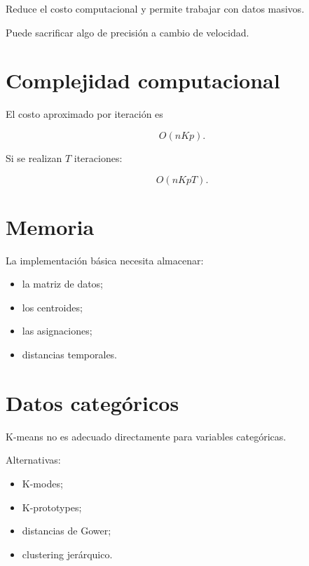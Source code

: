 \documentclass[
  spanish,
  10.5pt,
  letterpaper,
  DIV=11,
  numbers=noendperiod,
  oneside,
  open=any]{scrreprt}
\providecommand{\tightlist}{%
  \setlength{\itemsep}{0pt}\setlength{\parskip}{0pt}}
\theoremstyle{definition}
\theoremstyle{definition}
\theoremstyle{plain}
\theoremstyle{remark}
\begin{document}

Reduce el costo computacional y permite trabajar con datos masivos.

Puede sacrificar algo de precisión a cambio de velocidad.

\section*{Complejidad computacional}\label{complejidad-computacional-5}


El costo aproximado por iteración es

\[
O(nKp).
\]

Si se realizan \(T\) iteraciones:

\[
O(nKpT).
\]

\section*{Memoria}\label{memoria}


La implementación básica necesita almacenar:

\begin{itemize}
\tightlist
\item
  la matriz de datos;
\item
  los centroides;
\item
  las asignaciones;
\item
  distancias temporales.
\end{itemize}

\section*{Datos categóricos}\label{datos-categuxf3ricos}


K-means no es adecuado directamente para variables categóricas.

Alternativas:

\begin{itemize}
\tightlist
\item
  K-modes;
\item
  K-prototypes;
\item
  distancias de Gower;
\item
  clustering jerárquico.
\end{itemize}
\end{document}

